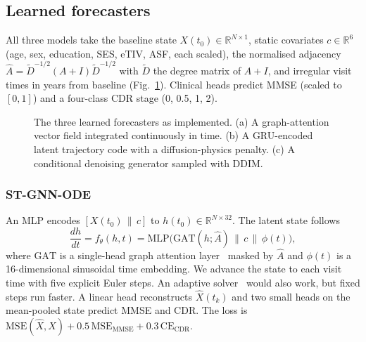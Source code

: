 \documentclass[conference]{IEEEtran}
\begin{document}
\subsection{Learned forecasters}
All three models take the baseline state $X(t_0)\in\mathbb{R}^{N\times1}$, static covariates $c\in\mathbb{R}^6$ (age, sex, education, SES, eTIV, ASF, each scaled), the normalised adjacency $\hat A=\tilde D^{-1/2}(A+I)\tilde D^{-1/2}$ with $\tilde D$ the degree matrix of $A+I$, and irregular visit times in years from baseline (Fig.~\ref{fig:models}). Clinical heads predict MMSE (scaled to $[0,1]$) and a four-class CDR stage (0, 0.5, 1, 2).

\begin{figure}[t]
\centering
\resizebox{0.95\textwidth}{!}{}
\caption{The three learned forecasters as implemented. (a) A graph-attention vector field integrated continuously in time. (b) A GRU-encoded latent trajectory code with a diffusion-physics penalty. (c) A conditional denoising generator sampled with DDIM.}
\label{fig:models}
\end{figure}

\subsubsection{ST-GNN-ODE}
An MLP encodes $[X(t_0)\,\|\,c]$ to $h(t_0)\in\mathbb{R}^{N\times32}$. The latent state follows
\begin{equation}
\frac{dh}{dt}=f_\theta(h,t)=\mathrm{MLP}\big(\mathrm{GAT}(h;\hat A)\,\|\,c\,\|\,\phi(t)\big),
\end{equation}
where $\mathrm{GAT}$ is a single-head graph attention layer~\cite{velickovic2018gat} masked by $\hat A$ and $\phi(t)$ is a 16-dimensional sinusoidal time embedding. We advance the state to each visit time with five explicit Euler steps. An adaptive solver~\cite{chen2018neuralode} would also work, but fixed steps run faster. A linear head reconstructs $\hat X(t_k)$ and two small heads on the mean-pooled state predict MMSE and CDR. The loss is $\mathrm{MSE}(\hat X,X)+0.5\,\mathrm{MSE}_{\mathrm{MMSE}}+0.3\,\mathrm{CE}_{\mathrm{CDR}}$.
\end{document}
